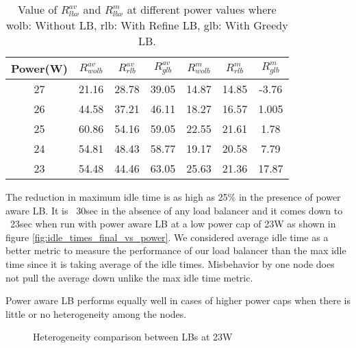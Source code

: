 \begin{table}[h]
\begin{tabular}{|c|c|c|c|c|c|c|}
\hline
Power(W) & $R^{av}_{wolb}$ & $R^{av}_{rlb}$ & $R^{av}_{glb}$ & $R^{m}_{wolb}$ & $R^{m}_{rlb}$ & $R^{m}_{glb}$ \\ \hline
27 & 21.16 & 28.78 & 39.05 & 14.87 & 14.85 & -3.76 \\ \hline
26 & 44.58 & 37.21 & 46.11 & 18.27 & 16.57 & 1.005 \\ \hline
25 & 60.86 & 54.16 & 59.05 & 22.55 & 21.61 & 1.78 \\ \hline
24 & 54.81 & 48.43 & 58.77 & 19.17 & 20.58 & 7.79 \\ \hline
23 & 54.48 & 44.46 & 63.05 & 25.63 & 21.36 & 17.87 \\ \hline
\end{tabular}
\caption{Value of $R^{av}_{lbx}$ and $R^{m}_{lbx}$ at different power values where wolb: Without LB, rlb: With Refine LB, glb: With Greedy LB. }
\label{tb:2}
\end{table}



The reduction in maximum idle time is as high as 25\% in the presence of power
aware LB. It is ~30sec in the absence of any load balancer and it comes down to
~23sec when run with power aware LB at a low power cap of 23W as shown in
figure \ref{fig:idle_times_final_vs_power}. 
We considered average idle time as a better metric to measure the performance
of our load balancer than the max idle time since it is taking average of the
idle times. Misbehavior by one node does not pull the average down unlike the
max idle time metric.

Power aware LB performs equally well in cases of higher power caps when there
is little or no heterogeneity among the nodes. 

\begin{figure}
\centering
\caption{Heterogeneity comparison between LBs at 23W} 
\label{fig:heter_final}
\end{figure}

